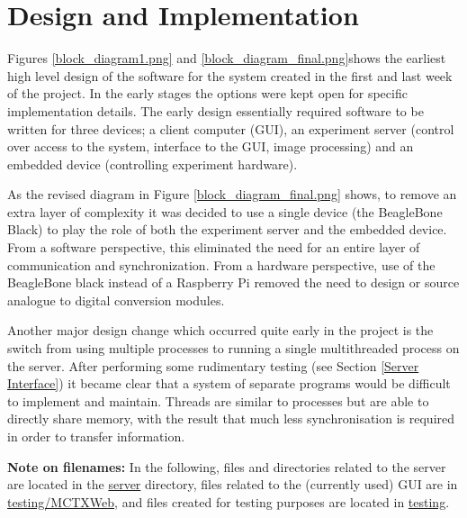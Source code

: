 \chapter{Design and Implementation}\label{Design and Implementation}


Figures \ref{block_diagram1.png} and \ref{block_diagram_final.png}shows the earliest high level design of the software for the system created in the first and last week of the project. In the early stages the options were kept open for specific implementation details. The early design essentially required software to be written for three devices; a client computer (GUI), an experiment server (control over access to the system, interface to the GUI, image processing) and an embedded device (controlling experiment hardware). 


As the revised diagram in Figure \ref{block_diagram_final.png} shows, to remove an extra layer of complexity it was decided to use a single device (the BeagleBone Black) to play the role of both the experiment server and the embedded device. From a software perspective, this eliminated the need for an entire layer of communication and synchronization. From a hardware perspective, use of the BeagleBone black instead of a Raspberry Pi removed the need to design or source analogue to digital conversion modules.

Another major design change which occurred quite early in the project is the switch from using multiple processes to running a single multithreaded process on the server. After performing some rudimentary testing (see Section \ref{Server Interface}) it became clear that a system of separate programs would be difficult to implement and maintain. Threads are similar to processes but are able to directly share memory, with the result that much less synchronisation is required in order to transfer information.

{\bf Note on filenames:} In the following, files and directories related to the server are located in the \href{https://github.com/szmoore/MCTX3420/tree/master/server}{server} directory, files related to the (currently used) GUI are in \href{https://github.com/szmoore/MCTX3420/tree/master/testing/MCTXWeb}{testing/MCTXWeb}, and files created for testing purposes are located in \href{https://github.com/szmoore/MCTX3420/tree/master/testing}{testing}.

